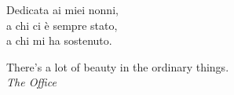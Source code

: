 \cleardoublepage
    \thispagestyle{empty}
            \begin{flushright}
				Dedicata ai miei nonni,\\
				a chi ci è sempre stato,\\
				a chi mi ha sostenuto.
				\\
				\vspace{2em}

				There's a lot of beauty in the ordinary things.\\
				\textit{The Office}

            \end{flushright}
\cleardoublepage